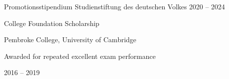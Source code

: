 %
\begin{cvhonors}%
  \cvhonor%
    {Promotionsstipendium} %
    {Studienstiftung des deutschen Volkes} %
    {} %
    {2020 -- 2024} %
\end{cvhonors}%
\begin{cvhonors}%
  \cvhonor%
    {College Foundation Scholarship} %
    {%
      Pembroke College, University of Cambridge\newline~
      \begin{cvitems}
        \item {Awarded for repeated excellent exam performance}
      \end{cvitems}
    } %
    {} %
    {2016 -- 2019} %
\end{cvhonors}
